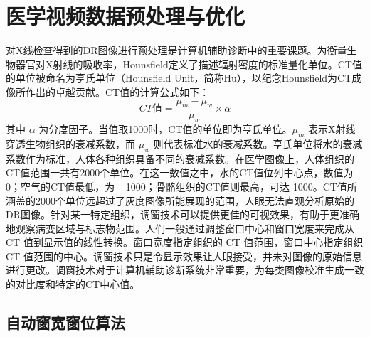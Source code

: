\section{医学视频数据预处理与优化}\label{sec:2}

对X线检查得到的DR图像进行预处理是计算机辅助诊断中的重要课题。为衡量生物器官对X射线的吸收率，Hounsfield\cite{peeters1979nobel}定义了描述辐射密度的标准量化单位。CT值的单位被命名为亨氏单位（Hounsfield Unit，简称Hu），以纪念Hounsfield为CT成像所作出的卓越贡献。CT值的计算公式如下：
\begin{equation}
    CT值 = \frac{\mu_m - \mu_w}{\mu_w} \times \alpha
\end{equation}
其中 $\alpha$ 为分度因子。当值取1000时，CT值的单位即为亨氏单位。$\mu_m$ 表示X射线穿透生物组织的衰减系数，而 $\mu_w$ 则代表标准水的衰减系数。亨氏单位将水的衰减系数作为标准，人体各种组织具备不同的衰减系数。在医学图像上，人体组织的 CT值范围一共有2000个单位。在这一数值之中，水的CT值位列中心点，数值为 \SI{0}{\Hu}；空气的CT值最低，为 \SI{-1000}{\Hu}；骨骼组织的CT值则最高，可达 \SI{1000}{\Hu}。CT值所涵盖的2000个单位远超过了灰度图像所能展现的范围，人眼无法直观分析原始的DR图像。针对某一特定组织，调窗技术可以提供更佳的可视效果，有助于更准确地观察病变区域与标志物范围。人们一般通过调整窗口中心和窗口宽度来完成从 CT 值到显示值的线性转换。窗口宽度指定组织的 CT 值范围，窗口中心指定组织 CT 值范围的中心。调窗技术只是令显示效果让人眼接受，并未对图像的原始信息进行更改。调窗技术对于计算机辅助诊断系统非常重要，为每类图像校准生成一致的对比度和特定的CT中心值。

\subsection{自动窗宽窗位算法}\label{sec:2_1}


